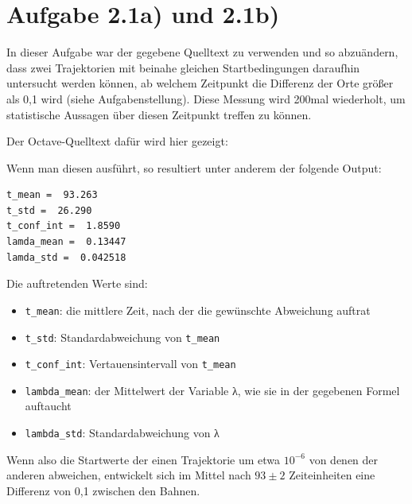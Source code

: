 \section*{Aufgabe 2.1a) und 2.1b)}
In dieser Aufgabe war der gegebene Quelltext zu verwenden und so abzuändern, 
dass zwei Trajektorien mit beinahe gleichen Startbedingungen daraufhin
untersucht werden können, ab welchem Zeitpunkt die Differenz der Orte größer als
0,1 wird (siehe Aufgabenstellung). Diese Messung wird 200mal wiederholt, um
statistische Aussagen über diesen Zeitpunkt treffen zu können.

Der Octave-Quelltext dafür wird hier gezeigt:


Wenn man diesen ausführt, so resultiert unter anderem der folgende Output:
\begin{lstlisting}[caption=Output unseres Programms,label=lst:output]
t_mean =  93.263
t_std =  26.290
t_conf_int =  1.8590
lamda_mean =  0.13447
lamda_std =  0.042518
\end{lstlisting}

Die auftretenden Werte sind:
\begin{itemize}
\item \texttt{t\_mean}: die mittlere Zeit, nach der die gewünschte Abweichung
  auftrat
\item \texttt{t\_std}: Standardabweichung von \texttt{t\_mean}
\item \texttt{t\_conf\_int}: Vertauensintervall von \texttt{t\_mean}
\item \texttt{lambda\_mean}: der Mittelwert der Variable λ, wie sie in der
  gegebenen Formel auftaucht
\item \texttt{lambda\_std}: Standardabweichung von λ
\end{itemize}

Wenn also die Startwerte der einen Trajektorie um etwa $10^{-6}$ von denen der
anderen abweichen, entwickelt sich im Mittel nach $93\pm2$ Zeiteinheiten eine
Differenz von 0,1 zwischen den Bahnen.

